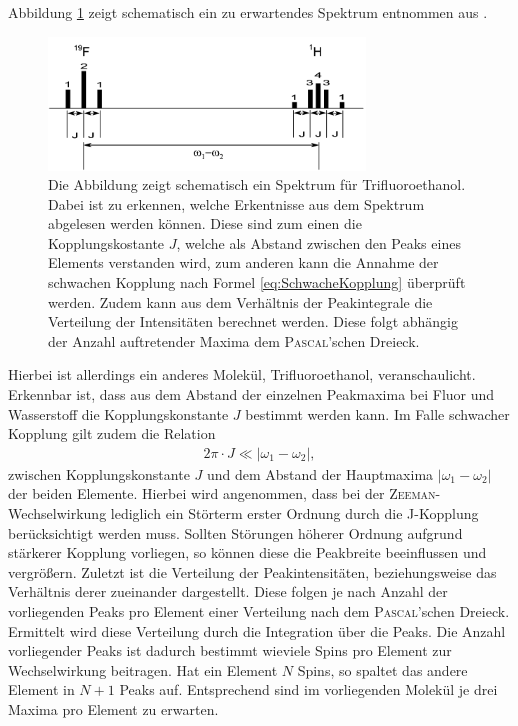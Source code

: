 Abbildung \ref{fig:JKSchema} zeigt schematisch ein zu erwartendes Spektrum entnommen aus \cite{Schmidt}.
\begin{figure}[H]
    \centering
    \includegraphics[width= 0.75\textwidth]{Abbildungen/JKopplungSchema.png} 
    \caption[Schematische Darstellung eines Spektrums zur veranschaulichung der erwartbaren Ergebnisse durch die Analyse der J-Kopplung.]{Die Abbildung zeigt schematisch ein Spektrum für Trifluoroethanol.
    Dabei ist zu erkennen, welche Erkentnisse aus dem Spektrum abgelesen werden können.
    Diese sind zum einen die Kopplungskostante $J$, welche als Abstand zwischen den Peaks eines Elements verstanden wird, zum anderen kann die Annahme der schwachen Kopplung nach Formel \eqref{eq:SchwacheKopplung} überprüft werden.
    Zudem kann aus dem Verhältnis der Peakintegrale die Verteilung der Intensitäten berechnet werden.
    Diese folgt abhängig der Anzahl auftretender Maxima dem \textsc{Pascal}'schen Dreieck.}
    \label{fig:JKSchema}
\end{figure}

Hierbei ist allerdings ein anderes Molekül, Trifluoroethanol, veranschaulicht.
Erkennbar ist, dass aus dem Abstand der einzelnen Peakmaxima bei Fluor und Wasserstoff die Kopplungskonstante $J$ bestimmt werden kann.
Im Falle schwacher Kopplung gilt zudem die Relation
\begin{align}
    2 \pi \cdot J \ll \vert \omega_1 - \omega_2 \vert , \label{eq:SchwacheKopplung}
\end{align}
zwischen Kopplungskonstante $J$ und dem Abstand der Hauptmaxima $\vert \omega_1 - \omega_2 \vert$ der beiden Elemente.
Hierbei wird angenommen, dass bei der \textsc{Zeeman}-Wechselwirkung lediglich ein Störterm erster Ordnung durch die J-Kopplung berücksichtigt werden muss.
Sollten Störungen höherer Ordnung aufgrund stärkerer Kopplung vorliegen, so können diese die Peakbreite beeinflussen und vergrößern.
Zuletzt ist die Verteilung der Peakintensitäten, beziehungsweise das Verhältnis derer zueinander dargestellt.
Diese folgen je nach Anzahl der vorliegenden Peaks pro Element einer Verteilung nach dem \textsc{Pascal}'schen Dreieck.
Ermittelt wird diese Verteilung durch die Integration über die Peaks.
Die Anzahl vorliegender Peaks ist dadurch bestimmt wieviele Spins pro Element zur Wechselwirkung beitragen.
Hat ein Element $N$ Spins, so spaltet das andere Element in $N+1$ Peaks auf.
Entsprechend sind im vorliegenden Molekül je drei Maxima pro Element zu erwarten. 

